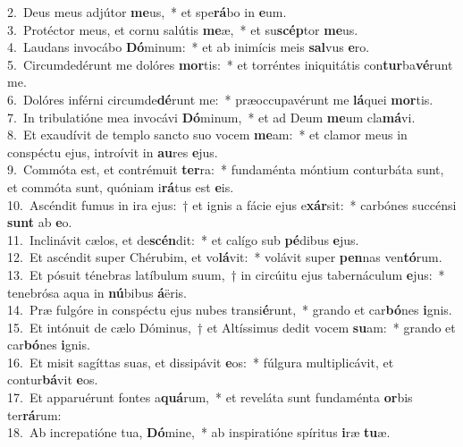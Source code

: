 {2.~}Deus meus adjútor \textbf{me}us,~* et spe\textbf{rá}bo in \textbf{e}um.\\
{3.~}Protéctor meus, et cornu salútis \textbf{me}æ,~* et su\textbf{scép}tor \textbf{me}us.\\
{4.~}Laudans invocábo \textbf{Dó}minum:~* et ab inimícis meis \textbf{sal}vus \textbf{e}ro.\\
{5.~}Circumdedérunt me dolóres \textbf{mor}tis:~* et torréntes iniquitátis con\textbf{tur}ba\textbf{vé}runt me.\\
{6.~}Dolóres inférni circumde\textbf{dé}runt me:~* præoccupavérunt me \textbf{lá}quei \textbf{mor}tis.\\
{7.~}In tribulatióne mea invocávi \textbf{Dó}minum,~* et ad Deum \textbf{me}um cla\textbf{má}vi.\\
{8.~}Et exaudívit de templo sancto suo vocem \textbf{me}am:~* et clamor meus in conspéctu ejus, introívit in \textbf{au}res \textbf{e}jus.\\
{9.~}Commóta est, et contrémuit \textbf{ter}ra:~* fundaménta móntium conturbáta sunt, et commóta sunt, quóniam i\textbf{rá}tus est \textbf{e}is.\\
{10.~}Ascéndit fumus in ira ejus:~† et ignis a fácie ejus e\textbf{xár}sit:~* carbónes succénsi \textbf{sunt} ab \textbf{e}o.\\
{11.~}Inclinávit cælos, et de\textbf{scén}dit:~* et calígo sub \textbf{pé}dibus \textbf{e}jus.\\
{12.~}Et ascéndit super Chérubim, et vo\textbf{lá}vit:~* volávit super \textbf{pen}nas ven\textbf{tó}rum.\\
{13.~}Et pósuit ténebras latíbulum suum,~† in circúitu ejus tabernáculum \textbf{e}jus:~* tenebrósa aqua in \textbf{nú}bibus \textbf{á}ëris.\\
{14.~}Præ fulgóre in conspéctu ejus nubes transi\textbf{é}runt,~* grando et car\textbf{bó}nes \textbf{i}gnis.\\
{15.~}Et intónuit de cælo Dóminus,~† et Altíssimus dedit vocem \textbf{su}am:~* grando et car\textbf{bó}nes \textbf{i}gnis.\\
{16.~}Et misit sagíttas suas, et dissipávit \textbf{e}os:~* fúlgura multiplicávit, et contur\textbf{bá}vit \textbf{e}os.\\
{17.~}Et apparuérunt fontes a\textbf{quá}rum,~* et reveláta sunt fundaménta \textbf{or}bis ter\textbf{rá}rum:\\
{18.~}Ab increpatióne tua, \textbf{Dó}mine,~* ab inspiratióne spíritus \textbf{i}ræ \textbf{tu}æ.\\
